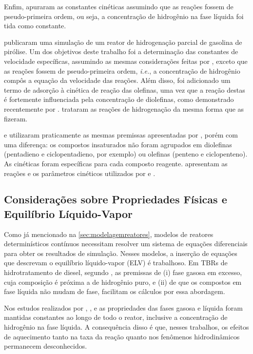 Enfim,  apuraram as constantes cinéticas assumindo que
as reações fossem de pseudo-primeira ordem, ou seja, a concentração de
hidrogênio na fase líquida foi tida como constante.

 publicaram uma simulação de um reator de
hidrogenação parcial de gasolina de pirólise. Um dos objetivos deste trabalho
foi a determinação das constantes de velocidade específicas, assumindo as
mesmas considerações feitas por , exceto que as
reações fossem de pseudo-primeira ordem, \emph{i.e.}, a concentração de
hidrogênio compôs a equação da velocidade das reações. Além disso, foi
adicionado um termo de adsorção à cinética de reação das olefinas, uma vez que a
reação destas é fortemente influenciada pela concentração de diolefinas, como
demonstrado recentemente por .
 trataram as reações
de hidrogenação da mesma forma que  as fizeram.

 e  utilizaram praticamente as
mesmas premissas apresentadas por , porém com uma
diferença: os compostos insaturados não foram agrupados em diolefinas
(pentadieno e ciclopentadieno, por exemplo) ou olefinas (penteno e
ciclopenteno). As cinéticas foram específicas para cada composto reagente.
 apresentam as reações e os parâmetros cinéticos
utilizados por  e .

\subsection{Considerações sobre Propriedades Físicas e Equilíbrio Líquido-Vapor}
\label{sec:consideracoeselv}

Como já mencionado na \autoref{sec:modelagemreatores}, modelos de reatores
determinísticos contínuos necessitam resolver um sistema de equações
diferenciais para obter os resultados de simulação. Nesses modelos, a inserção
de equações que descrevam o equilíbrio líquido-vapor (ELV) é trabalhoso. Em
TBRs de hidrotratamento de diesel, segundo , as
premissas de (i) fase gasosa em excesso, cuja composição é próxima a de
hidrogênio puro, e (ii) de que os compostos em fase líquida não mudam de fase,
facilitam os cálculos por essa abordagem.

Nos estudos realizados por ,
,  e
 as propriedades das fases gasosa e líquida foram
mantidas constantes ao longo de todo o reator, inclusive a concentração de
hidrogênio na fase líquida. A consequência disso é que, nesses trabalhos, os
efeitos de aquecimento tanto na taxa da reação quanto nos fenômenos
hidrodinâmicos permanecem desconhecidos.

